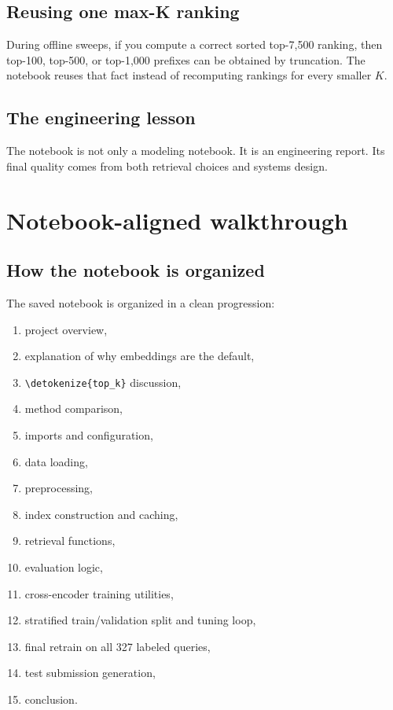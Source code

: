 \documentclass[10pt]{article}
\DeclareRobustCommand{\code}[1]{%
  \ifmmode
    \text{\nolinkurl{\detokenize{#1}}}%
  \else
    \nolinkurl{\detokenize{#1}}%
  \fi
}
\begin{document}
\subsection{Reusing one max-K ranking}

During offline sweeps, if you compute a correct sorted top-7,500 ranking, then top-100, top-500, or top-1,000 prefixes can be obtained by truncation. The notebook reuses that fact instead of recomputing rankings for every smaller \(K\).

\subsection{The engineering lesson}

The notebook is not only a modeling notebook. It is an engineering report. Its final quality comes from both retrieval choices and systems design.

\section{Notebook-aligned walkthrough}
\label{sec:walk}

\subsection{How the notebook is organized}

The saved notebook is organized in a clean progression:
\begin{enumerate}
    \item project overview,
    \item explanation of why embeddings are the default,
    \item \code{top_k} discussion,
    \item method comparison,
    \item imports and configuration,
    \item data loading,
    \item preprocessing,
    \item index construction and caching,
    \item retrieval functions,
    \item evaluation logic,
    \item cross-encoder training utilities,
    \item stratified train/validation split and tuning loop,
    \item final retrain on all 327 labeled queries,
    \item test submission generation,
    \item conclusion.
\end{enumerate}
\end{document}
